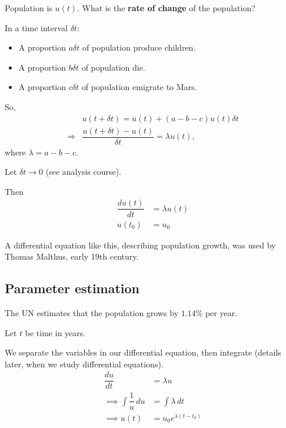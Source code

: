 \begin{example}
\begin{description}
Population is $u(t)$. What is the \textbf{rate of change} of the
population?

In a time interval $\delta t$:
\begin{itemize}
\item A proportion $a \delta t$ of population produce
children.

\item A proportion $b \delta t$ of population die.

\item A proportion $c \delta t$ of population emigrate to Mars.
\end{itemize}

So,
\begin{align*}
& u(t + \delta t)  =  u(t) + (a-b-c)u(t) \delta t  \\
\Longrightarrow & \dfrac{u(t+\delta t) - u(t)}{\delta t} =
\lambda u(t),
\end{align*}
where $\lambda = a - b - c$.

\end{description}

Let $\delta t \to 0$ (see analysis course).

Then
  \begin{align*}
    \dfrac{du(t)}{dt} & =  \lambda u(t)  \\
    u(t_{0}) & = u_{0}
  \end{align*}

A differential equation like this, describing population growth, was used by Thomas Malthus, early 19th century.

\subsection*{Parameter estimation}

The UN estimates that the population grows by $1.14\%$ per year.

Let $t$ be time in years.

We separate the variables in our differential equation, then integrate (details later, when we study differential equations).
  \begin{align*}
    \dfrac{du}{dt} & = \lambda u  \\
    \implies \int \dfrac{1}{u} \, du & = \int \lambda \, dt  \\
    \implies u(t) & = u_{0} e^{\lambda(t-t_{0})}
  \end{align*}


\end{example}
